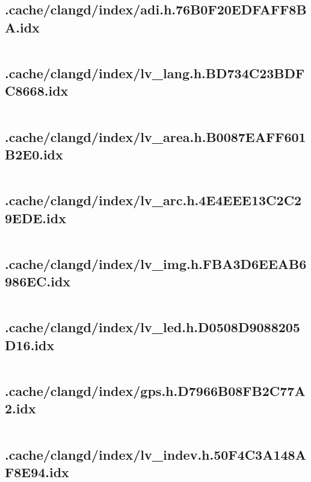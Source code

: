 \subsection{.cache/clangd/index/adi.h.76B0F20EDFAFF8BA.idx}
\inputminted[linenos,tabsize=2,breaklines, breakanywhere]{c}{adi.h.76B0F20EDFAFF8BA.idx}
\pagebreak

\subsection{.cache/clangd/index/lv_lang.h.BD734C23BDFC8668.idx}
\inputminted[linenos,tabsize=2,breaklines, breakanywhere]{c}{lv_lang.h.BD734C23BDFC8668.idx}
\pagebreak

\subsection{.cache/clangd/index/lv_area.h.B0087EAFF601B2E0.idx}
\inputminted[linenos,tabsize=2,breaklines, breakanywhere]{c}{lv_area.h.B0087EAFF601B2E0.idx}
\pagebreak

\subsection{.cache/clangd/index/lv_arc.h.4E4EEE13C2C29EDE.idx}
\inputminted[linenos,tabsize=2,breaklines, breakanywhere]{c}{lv_arc.h.4E4EEE13C2C29EDE.idx}
\pagebreak

\subsection{.cache/clangd/index/lv_img.h.FBA3D6EEAB6986EC.idx}
\inputminted[linenos,tabsize=2,breaklines, breakanywhere]{c}{lv_img.h.FBA3D6EEAB6986EC.idx}
\pagebreak

\subsection{.cache/clangd/index/lv_led.h.D0508D9088205D16.idx}
\inputminted[linenos,tabsize=2,breaklines, breakanywhere]{c}{lv_led.h.D0508D9088205D16.idx}
\pagebreak

\subsection{.cache/clangd/index/gps.h.D7966B08FB2C77A2.idx}
\inputminted[linenos,tabsize=2,breaklines, breakanywhere]{c}{gps.h.D7966B08FB2C77A2.idx}
\pagebreak

\subsection{.cache/clangd/index/lv_indev.h.50F4C3A148AF8E94.idx}
\inputminted[linenos,tabsize=2,breaklines, breakanywhere]{c}{lv_indev.h.50F4C3A148AF8E94.idx}
\pagebreak

